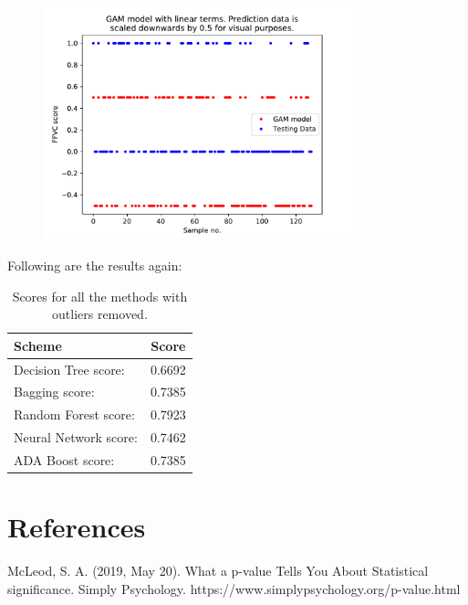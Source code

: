 \documentclass[]{article}
\begin{document}
\begin{figure}[H]
	\centering
	\includegraphics[width=0.8\textwidth]{figures/LASTTHREE.pdf}
	\label{fig:LASTTHREE}
\end{figure}

Following are the results again:

\begin{table}[H]
	\centering
	\caption{Scores for all the methods with outliers removed.}
	\begin{tabular}[t]{l@{\hskip 0.5in}c}
		\toprule
		Scheme & Score \\
		\midrule
		Decision Tree score:&	 0.6692\\
		Bagging score:  	& 0.7385\\
		Random Forest score:&	 0.7923\\
		Neural Network score:&	 0.7462\\
		ADA Boost score:	 &0.7385\\
		\bottomrule
	\end{tabular}
	\label{tab:LASTONE}
\end{table}




\section*{References}
McLeod, S. A. (2019, May 20). What a p-value Tells You About Statistical significance. Simply Psychology. https://www.simplypsychology.org/p-value.html
\end{document}
